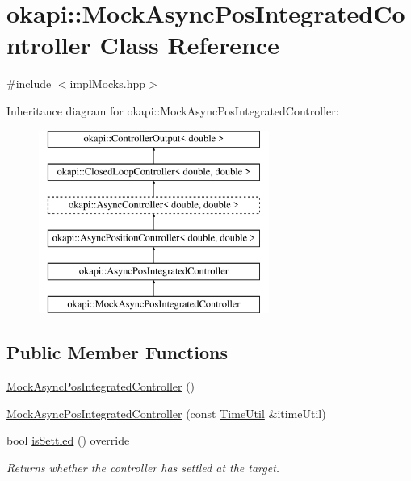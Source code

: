 \hypertarget{classokapi_1_1MockAsyncPosIntegratedController}{}\section{okapi\+::Mock\+Async\+Pos\+Integrated\+Controller Class Reference}
\label{classokapi_1_1MockAsyncPosIntegratedController}


{\ttfamily \#include $<$impl\+Mocks.\+hpp$>$}

Inheritance diagram for okapi\+::Mock\+Async\+Pos\+Integrated\+Controller\+:\begin{figure}[H]
\begin{center}
\leavevmode
\includegraphics[height=6.000000cm]{classokapi_1_1MockAsyncPosIntegratedController}
\end{center}
\end{figure}
\subsection*{Public Member Functions}
\begin{DoxyCompactItemize}
\item 
\mbox{\hyperlink{classokapi_1_1MockAsyncPosIntegratedController_a9972a48754d00c2d9058755b20d384a4}{Mock\+Async\+Pos\+Integrated\+Controller}} ()
\item 
\mbox{\hyperlink{classokapi_1_1MockAsyncPosIntegratedController_a3a1f671cf057878894e495ed608ce992}{Mock\+Async\+Pos\+Integrated\+Controller}} (const \mbox{\hyperlink{classokapi_1_1TimeUtil}{Time\+Util}} \&itime\+Util)
\item 
bool \mbox{\hyperlink{classokapi_1_1MockAsyncPosIntegratedController_ac97459be83cf9ddb555092bc5e99a279}{is\+Settled}} () override
\begin{DoxyCompactList}\small\item\em Returns whether the controller has settled at the target. \end{DoxyCompactList}\end{DoxyCompactItemize}
